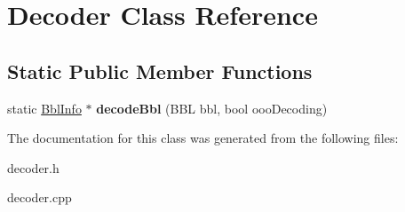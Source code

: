 \hypertarget{classDecoder}{\section{Decoder Class Reference}
\label{classDecoder}
}
\subsection*{Static Public Member Functions}
\begin{DoxyCompactItemize}
\item 
\hypertarget{classDecoder_a42cfea2d7b919c4be5a8406f4a298950}{static \hyperlink{structBblInfo}{Bbl\-Info} $\ast$ {\bfseries decode\-Bbl} (B\-B\-L bbl, bool ooo\-Decoding)}\label{classDecoder_a42cfea2d7b919c4be5a8406f4a298950}

\end{DoxyCompactItemize}


The documentation for this class was generated from the following files\-:\begin{DoxyCompactItemize}
\item 
decoder.\-h\item 
decoder.\-cpp\end{DoxyCompactItemize}
